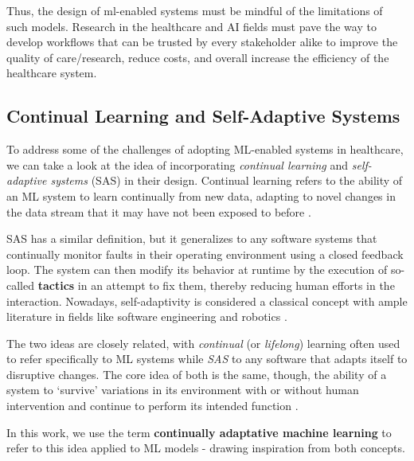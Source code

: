 \documentclass[../main.tex]{subfiles}
\begin{document}
    Thus, the design of ml-enabled systems must be mindful of the limitations of such models. Research in the healthcare and AI fields must pave the way to develop workflows that can be trusted by every stakeholder alike to improve the quality of care/research, reduce costs, and overall increase the efficiency of the healthcare system.

    \vspace*{-0.5cm}
    \subsection{Continual Learning and Self-Adaptive Systems} \label{sec:lifelong_adaptive_systems}

    To address some of the challenges of adopting ML-enabled systems in healthcare, we can take a look at the idea of incorporating \textit{continual learning} and \textit{self-adaptive systems} (SAS) in their design. Continual learning refers to the ability of an ML system to learn continually from new data, adapting to novel changes in the data stream that it may have not been exposed to before \cite{parisi_continual_2019}. 
    
    SAS has a similar definition, but it generalizes to any software systems that continually monitor faults in their operating environment using a closed feedback loop. The system can then modify its behavior at runtime by the execution of so-called \textbf{tactics} in an attempt to fix them, thereby reducing human efforts in the interaction. Nowadays, self-adaptivity is considered a classical concept with ample literature in fields like software engineering and robotics \cite{macias-escrivaSelfadaptiveSystemsSurvey2013,gheibiApplyingMachineLearning2020,casimiro_self-adaptive_2022}.

    
    The two ideas are closely related, with \textit{continual} (or \textit{lifelong}) learning often used to refer specifically to ML systems while \textit{SAS} to any software that adapts itself to disruptive changes. The core idea of both is the same, though, the ability of a system to `survive' variations in its environment with or without human intervention and continue to perform its intended function \cite{macias-escrivaSelfadaptiveSystemsSurvey2013}. 
    
    In this work, we use the term \textbf{continually adaptative machine learning} to refer to this idea applied to ML models - drawing inspiration from both concepts. 
\end{document}
